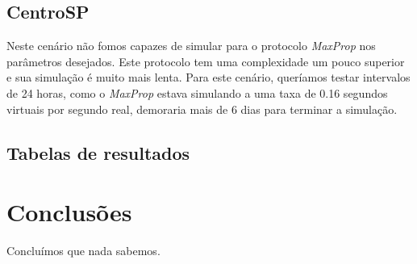 \documentclass[conference]{IEEEtran}
\begin{document}
\subsection{CentroSP}
Neste cenário não fomos capazes de simular para o protocolo \emph{MaxProp} nos parâmetros desejados. Este protocolo tem uma complexidade um pouco superior e sua simulação é muito mais lenta. Para este cenário, queríamos testar intervalos de 24 horas, como o \emph{MaxProp} estava simulando a uma taxa de 0.16 segundos virtuais por segundo real, demoraria mais de 6 dias para terminar a simulação.


\subsection{Tabelas de resultados}
\label{sec:resultados:tabelas}

\section{Conclusões}
Concluímos que nada sabemos.

%
%



%
%
\end{document}
